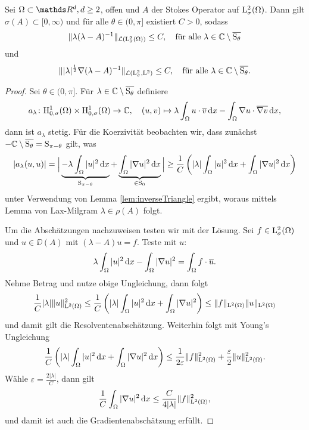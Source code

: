 \begin{prop}
  Sei $\Omega \subset \R^d, d\geq2$, offen und $A$ der Stokes Operator auf $\mathrm{L}^2_\sigma(\Omega)$. Dann gilt $\sigma(A) \subset [0,\infty)$ und für alle $\theta \in (0,\pi]$ existiert $C > 0$, sodass
  $$
  \| \lambda (\lambda - A)^{-1}\|_{\mathcal{L}(\mathrm{L}^2_\sigma(\Omega))} \leq C, \quad\text{für alle } \lambda \in \mathbb{C} \setminus \overline{\mathrm{S}_\theta}
  $$
  und
  $$
  \| |\lambda|^{\frac{1}{2}} \nabla (\lambda - A)^{-1} \|_{\mathcal{L}(\mathrm{L}_\sigma^2, \mathrm{L}^2)} \leq C, \quad\text{für alle } \lambda \in \mathbb{C} \setminus \overline{\mathrm{S}_\theta}.
  $$
\end{prop}

\begin{proof}
  Sei $\theta \in (0,\pi]$. 
  Für $\lambda \in \mathbb{C} \setminus \overline{\mathrm{S}_\theta}$ definiere
  $$
  a_\lambda \colon \mathrm{H}_{0,\sigma}^1(\Omega) \times \mathrm{H}_{0,\sigma}^1(\Omega) \to \mathbb{C}, \quad (u,v) \mapsto \lambda \int_\Omega u \cdot \overline v \, {\operatorname{d}\!{x}} - \int_\Omega \nabla u \cdot \overline{\nabla v} \, {\operatorname{d}\!{x}},
  $$
  dann ist $a_\lambda$ stetig.
  Für die Koerzivität beobachten wir, dass zunächst $- \mathbb{C} \setminus \overline{\mathrm{S}_\theta} = \mathrm{S}_{\pi - \theta}$ gilt, was
  $$
  |a_\lambda(u,u)| 
  = \Big| \underbrace{- \lambda\int_\Omega |u|^2 \, {\operatorname{d}\!{x}}}_{\mathrm{S}_{\pi - \theta}} + \underbrace{\int_\Omega |\nabla u|^2 \, {\operatorname{d}\!{x}}}_{\in \mathrm{S}_0} \Big| 
  \geq \frac{1}{C} \left( |\lambda| \int_\Omega |u|^2 \, {\operatorname{d}\!{x}} + \int_\Omega |\nabla u|^2 \, {\operatorname{d}\!{x}}\right)
  $$
  unter Verwendung von Lemma \ref{lem:inverseTriangle} ergibt, woraus mittels Lemma von Lax-Milgram $\lambda \in \rho(A)$ folgt.
  
  Um die Abschätzungen nachzuweisen testen wir mit der Lösung.  
  Sei $f \in \mathrm{L}_\sigma^2(\Omega)$ und $u \in \DD(A)$ mit $(\lambda - A) u = f$.
  Teste mit $u$:
  $$
  \lambda \int_\Omega |u|^2 \, {\operatorname{d}\!{x}} - \int_\Omega |\nabla u|^2 = \int_\Omega f \cdot \overline u.
  $$
  Nehme Betrag und nutze obige Ungleichung, dann folgt
  $$
  \frac{1}{C} |\lambda|\|u\|_{\mathrm{L}^2(\Omega)}^2 
  \leq \frac{1}{C} \left(|\lambda| \int_\Omega |u|^2 \, {\operatorname{d}\!{x}} + \int_\Omega |\nabla u|^2\right) 
  \leq \|f\|_{\mathrm{L}^2(\Omega)} \|u\|_{\mathrm{L}^2(\Omega)}
  $$
  und damit gilt die Resolventenabschätzung.
  Weiterhin folgt mit Young's Ungleichung
  $$
  \frac{1}{C} \left(|\lambda| \int_\Omega |u|^2 \, {\operatorname{d}\!{x}} + \int_\Omega |\nabla u|^2 \, {\operatorname{d}\!{x}} \right)
  \leq \frac{1}{2\varepsilon} \|f\|_{\mathrm{L}^2(\Omega)}^2 + \frac{\varepsilon}{2} \|u\|_{\mathrm{L}^2(\Omega)}^2.
  $$
  Wähle $\varepsilon = \frac{2| \lambda|}{C}$, dann gilt
  $$
  \frac{1}{C} \int_\Omega |\nabla u|^2 \, {\operatorname{d}\!{x}} \leq \frac{C}{4|\lambda|} \|f \|_{\mathrm{L}^2(\Omega)}^2,
  $$
  und damit ist auch die Gradientenabschätzung erfüllt.
\end{proof}

